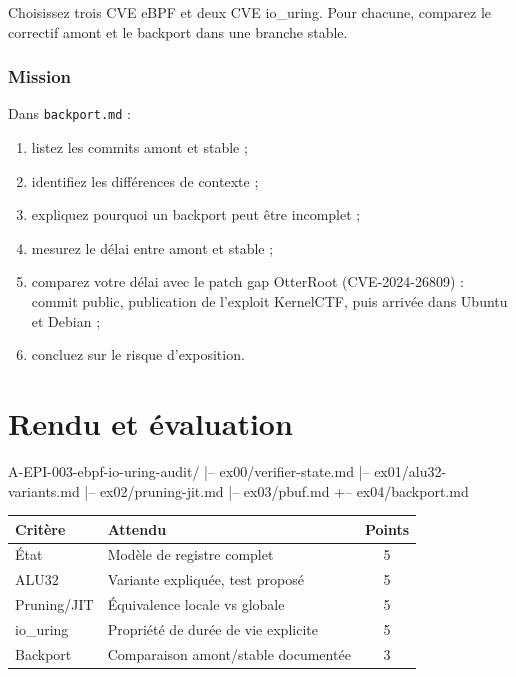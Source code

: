 \documentclass{training}
\begin{document}
Choisissez trois CVE eBPF et deux CVE io\_uring. Pour chacune, comparez le
correctif amont et le backport dans une branche stable.

\subsection*{Mission}

Dans \texttt{backport.md} :

\begin{enumerate}
  \item listez les commits amont et stable ;
  \item identifiez les différences de contexte ;
  \item expliquez pourquoi un backport peut être incomplet ;
  \item mesurez le délai entre amont et stable ;
  \item comparez votre délai avec le patch gap OtterRoot
        (CVE-2024-26809) : commit public, publication de l'exploit
        KernelCTF, puis arrivée dans Ubuntu et Debian ;
  \item concluez sur le risque d'exposition.
\end{enumerate}

\chapter{Rendu et évaluation}

\begin{console}
A-EPI-003-ebpf-io-uring-audit/
|-- ex00/verifier-state.md
|-- ex01/alu32-variants.md
|-- ex02/pruning-jit.md
|-- ex03/pbuf.md
+-- ex04/backport.md
\end{console}

\begin{center}
\begin{tabularx}{\linewidth}{|l|X|c|}
\hline
\textbf{Critère} & \textbf{Attendu} & \textbf{Points} \\ \hline
État & Modèle de registre complet & 5 \\ \hline
ALU32 & Variante expliquée, test proposé & 5 \\ \hline
Pruning/JIT & Équivalence locale vs globale & 5 \\ \hline
io\_uring & Propriété de durée de vie explicite & 5 \\ \hline
Backport & Comparaison amont/stable documentée & 3 \\ \hline
\end{tabularx}
\end{center}
\end{document}
